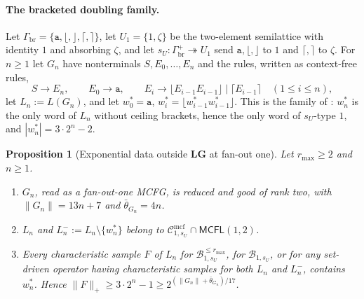 \documentclass[11pt]{article}
\numberwithin{equation}{section}
\theoremstyle{plain}
\newtheorem{proposition}[theorem]{Proposition}
\theoremstyle{definition}
\theoremstyle{remark}
\newcommand{\Cmcf}[2]{\mathcal{C}^{\mathrm{mcf}}_{#1,#2}}
\theoremstyle{plain}
\begin{document}
\paragraph{The bracketed doubling family.}
Let $\Gamma_{\mathrm{br}}=\{\mathtt a,\lfloor,\rfloor,\lceil,\rceil\}$,
let $U_1=\{1,\zeta\}$ be the two-element semilattice with identity
$1$ and absorbing $\zeta$, and let
$s_U:\Gamma_{\mathrm{br}}^+\twoheadrightarrow U_1$ send
$\mathtt a,\lfloor,\rfloor$ to $1$ and $\lceil,\rceil$ to $\zeta$.  For
$n\ge1$ let $G_n$ have nonterminals $S,E_0,\ldots,E_n$ and the rules,
written as context-free rules,
\[
 S\to E_n,\qquad E_0\to\mathtt a,\qquad
 E_i\to\lfloor E_{i-1}E_{i-1}\rfloor\mid\lceil E_{i-1}\rceil
 \quad(1\le i\le n),
\]
let $L_n:=L(G_n)$, and let $w^*_0=\mathtt a$,
$w^*_i=\lfloor w^*_{i-1}w^*_{i-1}\rfloor$.  This is the family of
\cite[Section~6]{kuriyamaCFG}: $w^*_n$ is the only word of $L_n$ without
ceiling brackets, hence the only word of $s_U$-type $1$, and
$|w^*_n|=3\cdot2^n-2$.

\begin{proposition}[Exponential data outside $\mathbf{LG}$ at fan-out one]
\label{prop:fanout-one-lower}
Let $r_{\max}\ge2$ and $n\ge1$.
\begin{enumerate}[label=\textup{(\roman*)},leftmargin=*]
\item $G_n$, read as a fan-out-one MCFG, is reduced and good of rank two,
with $\|G_n\|=13n+7$ and $\bar\theta_{G_n}=4n$.
\item $L_n$ and $L_n^-:=L_n\setminus\{w^*_n\}$ belong to
$\Cmcf{1}{s_U}\cap\mathsf{MCFL}(1,2)$.
\item Every characteristic sample $F$ of $L_n$ for
$\mathcal B^{\le r_{\max}}_{1,s_U}$, for $\mathcal B_{1,s_U}$, or for any
set-driven operator having characteristic samples for both $L_n$ and
$L_n^-$, contains $w^*_n$.  Hence
$\|F\|_+\ge3\cdot2^n-1\ge2^{(\|G_n\|+\bar\theta_{G_n})/17}$.
\end{enumerate}
\end{proposition}
\end{document}
